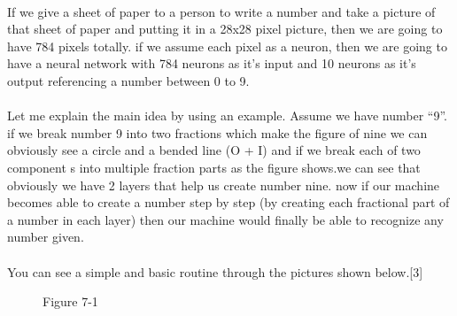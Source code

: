 \documentclass[12pt , a4paper]{article}
\begin{document}
\paragraph{} If we give a sheet of paper to a person to write a number and take a picture of that sheet of paper and putting it in a 28x28 pixel picture, then we are going to have 784 pixels totally. if we assume each pixel as a neuron, then we are going to have a neural network with 784 neurons as it’s input and 10 neurons as it’s output referencing a number between 0 to 9. \\
\paragraph{} Let me explain the main idea by using an example. Assume we have number “9”. if we break number 9 into two fractions which make the figure of nine we can obviously see a circle and a bended line (O +  I) and if we break each of two component s into multiple fraction parts as the figure shows.we can see that obviously we have 2 layers that help us create number nine. now if our machine becomes able to create a number step by step (by creating each fractional part of a number in each layer) then our machine would finally be able to recognize any number given. \\
\paragraph{} You can see a simple and basic routine through the pictures shown below.[3] \\




\begin{figure}[H]
\centering
\setlength{\fboxrule}{5pt}
\caption*{Figure 7-1}
\label{f-6-1}
\end{figure}
\end{document}
